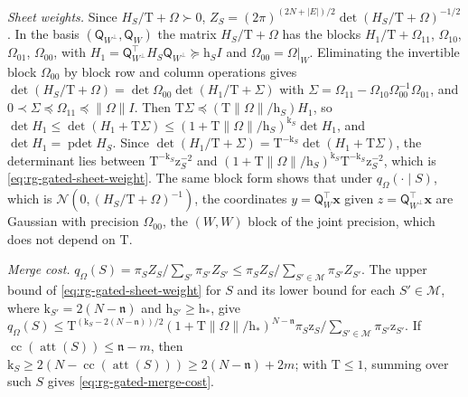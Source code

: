 \emph{Sheet weights.} Since \(H_S/\mathrm T+\Omega\succ0\),
\(Z_S=(2\pi)^{(2N+|E|)/2}\det(H_S/\mathrm T+\Omega)^{-1/2}\). In the basis
\((\mathsf Q_{W^\perp},\mathsf Q_W)\) the matrix \(H_S/\mathrm T+\Omega\) has
the blocks \(H_1/\mathrm T+\Omega_{11}\), \(\Omega_{10}\), \(\Omega_{01}\),
\(\Omega_{00}\), with \(H_1=\mathsf Q_{W^\perp}^\top H_S\mathsf Q_{W^\perp}\succeq\mathrm h_SI\)
and \(\Omega_{00}=\Omega|_W\). Eliminating the invertible block
\(\Omega_{00}\) by block row and column operations gives
\(\det(H_S/\mathrm T+\Omega)=\det\Omega_{00}\det(H_1/\mathrm T+\Sigma)\) with
\(\Sigma=\Omega_{11}-\Omega_{10}\Omega_{00}^{-1}\Omega_{01}\), and
\(0\prec\Sigma\preceq\Omega_{11}\preceq\|\Omega\|I\). Then
\(\mathrm T\Sigma\preceq(\mathrm T\|\Omega\|/\mathrm h_S)H_1\), so
\(\det H_1\le\det(H_1+\mathrm T\Sigma)\le(1+\mathrm T\|\Omega\|/\mathrm h_S)^{\mathrm k_S}\det H_1\),
and \(\det H_1=\operatorname{pdet}H_S\). Since
\(\det(H_1/\mathrm T+\Sigma)=\mathrm T^{-\mathrm k_S}\det(H_1+\mathrm T\Sigma)\),
the determinant lies between \(\mathrm T^{-\mathrm k_S}\mathrm z_S^{-2}\) and
\((1+\mathrm T\|\Omega\|/\mathrm h_S)^{\mathrm k_S}\mathrm T^{-\mathrm k_S}\mathrm z_S^{-2}\),
which is \cref{eq:rg-gated-sheet-weight}. The same block form shows that
under \(q_\Omega(\cdot\mid S)\), which is
\(\mathcal N(0,(H_S/\mathrm T+\Omega)^{-1})\), the coordinates
\(y=\mathsf Q_W^\top\mathbf x\) given \(z=\mathsf Q_{W^\perp}^\top\mathbf x\)
are Gaussian with precision \(\Omega_{00}\), the \((W,W)\) block of the joint
precision, which does not depend on \(\mathrm T\).

\emph{Merge cost.} \(q_\Omega(S)=\pi_SZ_S/\sum_{S'}\pi_{S'}Z_{S'}
\le\pi_SZ_S/\sum_{S'\in\mathcal M}\pi_{S'}Z_{S'}\). The upper bound of
\cref{eq:rg-gated-sheet-weight} for \(S\) and its lower bound for each
\(S'\in\mathcal M\), where \(\mathrm k_{S'}=2(N-\mathfrak n)\) and
\(\mathrm h_{S'}\ge\mathrm h_*\), give
\(q_\Omega(S)\le\mathrm T^{(\mathrm k_S-2(N-\mathfrak n))/2}
(1+\mathrm T\|\Omega\|/\mathrm h_*)^{N-\mathfrak n}
\pi_S\mathrm z_S/\sum_{S'\in\mathcal M}\pi_{S'}\mathrm z_{S'}\). If
\(\operatorname{cc}(\operatorname{att}(S))\le\mathfrak n-m\), then
\(\mathrm k_S\ge2(N-\operatorname{cc}(\operatorname{att}(S)))\ge2(N-\mathfrak n)+2m\);
with \(\mathrm T\le1\), summing over such \(S\) gives
\cref{eq:rg-gated-merge-cost}.


